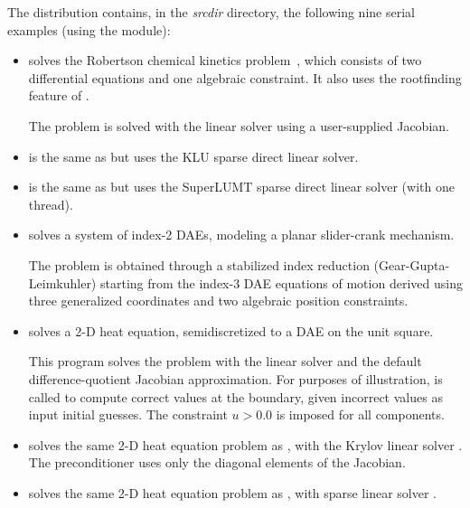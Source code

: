 \vspace{0.2in}\noindent
The {\ida} distribution contains, in the {\em srcdir}
directory, the following nine serial examples (using the {\nvecs} module):
\begin{itemize}

\item {}
  solves the Robertson chemical kinetics problem~\cite{Rob:66}, which consists
  of two differential equations and one algebraic constraint.  It also uses
  the rootfinding feature of {\ida}.

  The problem is solved with the {\idadense} linear solver using
  a user-supplied Jacobian.

\item {}
  is the same as  but uses the KLU sparse direct linear solver.

\item {}
  is the same as  but uses the SuperLUMT sparse direct linear
  solver (with one thread).

\item {}
  solves a system of index-2 DAEs, modeling a planar slider-crank mechanism.

  The problem is obtained through a stabilized index reduction (Gear-Gupta-Leimkuhler)
  starting from the index-3 DAE equations of motion derived using three generalized
  coordinates and two algebraic position constraints.

\item {}
  solves a 2-D heat equation, semidiscretized to a DAE on the unit square.

  This program solves the problem with the {\idaband} linear solver and
  the default difference-quotient Jacobian approximation. For purposes of
  illustration,  is called to compute correct values at the
  boundary, given incorrect values as input initial guesses. The constraint
  $u > 0.0$ is imposed for all components.

\item {}
  solves the same 2-D heat equation problem as , with the Krylov
  linear solver {\idaspgmr}. The preconditioner uses only the diagonal elements
  of the Jacobian.

\item {}
  solves the same 2-D heat equation problem as , with
  sparse linear solver {\idaklu}.


\end{itemize}
